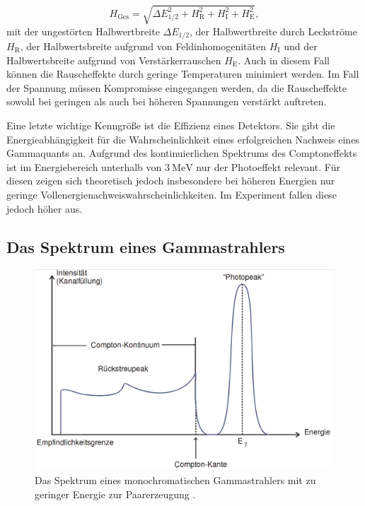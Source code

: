 \begin{equation}
    H_\text{Ges} = \sqrt{\Delta E_\text{1/2}^2 + H_\text{R}^2 + H_\text{I}^2 + H_\text{E}^2}, \label{eq:Hges}
\end{equation}
mit der ungestörten Halbwertbreite $\Delta E_\text{1/2}$, der Halbwertbreite durch Leckströme $H_\text{R}$, der Halbwertsbreite aufgrund von Feldinhomogenitäten $H_\text{I}$ und der Halbwertsbreite aufgrund von Verstärkerrauschen $H_\text{E}$.
Auch in diesem Fall können die Rauscheffekte durch geringe Temperaturen minimiert werden. Im Fall der Spannung müssen Kompromisse eingegangen werden, da die Rauscheffekte sowohl bei geringen als auch bei höheren Spannungen verstärkt auftreten.

Eine letzte wichtige Kenngröße ist die Effizienz eines Detektors. Sie gibt die Energieabhängigkeit für die Wahrscheinlichkeit eines erfolgreichen Nachweis eines Gammaquants an. Aufgrund des kontinuierlichen Spektrums des Comptoneffekts ist im Energiebereich unterhalb von $\SI{3}{\mega\electronvolt}$ nur der Photoeffekt relevant. Für diesen zeigen sich theoretisch jedoch insbesondere bei höheren Energien nur geringe Vollenergienachweiswahrscheinlichkeiten. Im Experiment fallen diese jedoch höher aus. 

\subsection{Das Spektrum eines Gammastrahlers}

\begin{figure}
	\centering
	\includegraphics[width=\linewidth-100pt,height=\textheight-100pt,keepaspectratio]{content/Images/spek.png}
    \caption{Das Spektrum eines monochromatischen Gammastrahlers mit zu geringer Energie zur Paarerzeugung \cite{V18}.}
    \label{fig:spektrum}
\end{figure}

